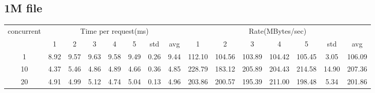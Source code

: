 \documentclass{article}
\begin{document}
\subsection*{1M file}
\begin{table}[H]
    \begin{tabular}{|c|c|c|c|c|c|c|c|c|c|c|c|c|c|c|}
        \hline
        \multirow{2}{*}{concurrent} & \multicolumn{7}{c|}{Time per request(ms)} & \multicolumn{7}{c|}{Rate(MBytes/sec)}                                                                                                  \\ \cline{2-15}
                                    & 1                                         & 2                                     & 3    & 4    & 5    & std  & avg  & 1      & 2      & 3      & 4      & 5      & std   & avg    \\ \hline
        1                           & 8.92                                      & 9.57                                  & 9.63 & 9.58 & 9.49 & 0.26 & 9.44 & 112.10 & 104.56 & 103.89 & 104.42 & 105.45 & 3.05  & 106.09 \\ \hline
        10                          & 4.37                                      & 5.46                                  & 4.86 & 4.89 & 4.66 & 0.36 & 4.85 & 228.79 & 183.12 & 205.89 & 204.43 & 214.58 & 14.90 & 207.36 \\ \hline
        20                          & 4.91                                      & 4.99                                  & 5.12 & 4.74 & 5.04 & 0.13 & 4.96 & 203.86 & 200.57 & 195.39 & 211.00 & 198.48 & 5.34  & 201.86 \\ \hline
    \end{tabular}
\end{table}
\end{document}

